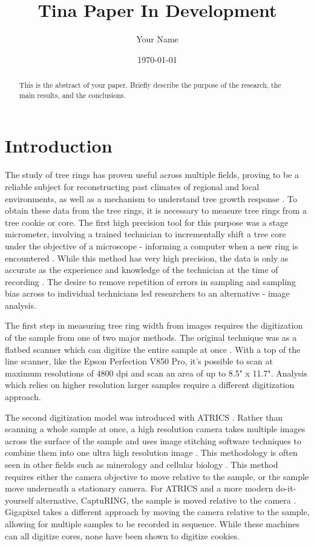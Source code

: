 \documentclass[a4paper,12pt]{article}
\title{Tina Paper In Development}
\author{Your Name}
\date{\today}
\begin{document}
\maketitle

\begin{abstract}
    This is the abstract of your paper. Briefly describe the purpose of the research, the main results, and the conclusions.
\end{abstract}

\section{Introduction}
The study of tree rings has proven useful across multiple fields, proving to be a reliable subject for reconstructing past climates of regional and local environments, as well as a mechanism to understand tree growth response \citep{fritts_dendroclimatology_1971} \citep{williams_using_2010} \citep{guibal_dendrochronology_2021} \citep{sheppard_dendroclimatology_2010}.
To obtain these data from the tree rings, it is necessary to measure tree rings from a tree cookie or core. The first high precision tool for this purpose was a stage micrometer, involving a trained technician to incrementally shift a tree core under the objective of a microscope - informing a computer when a new ring is encountered \citep{robinson_microcomputer_nodate}.
While this method has very high precision, the data is only as accurate as the experience and knowledge of the technician at the time of recording \citep{levanic_atrics_2007}.
The desire to remove repetition of errors in sampling and sampling bias across to individual technicians led researchers to an alternative - image analysis. 

The first step in measuring tree ring width from images requires the digitization of the sample from one of two major methods.  
The original technique was as a flatbed scanner which can digitize the entire sample at once \citep{guay_new_1992}. 
With a top of the line scanner, like the Epson Perfection V850 Pro, it's possible to scan at maximum resolutions of 4800 dpi and scan an area of up to 8.5" x 11.7".
Analysis which relies on higher resolution larger samples require a different digitization approach. 

The second digitization model was introduced with ATRICS \citep{levanic_atrics_2007}. 
Rather than scanning a whole sample at once, a high resolution camera takes multiple images across the surface of the sample and uses image stitching software techniques to combine them into one ultra high resolution image \citep{muhlich_stitching_2022}.
This methodology is often seen in other fields such as mineralogy and cellular biology \citep{ro_image_2021,mohammadi_fast_2024}. 
This method requires either the camera objective to move relative to the sample, or the sample move underneath a stationary camera. 
For ATRICS and a more modern do-it-yourself alternative, CaptuRING, the sample is moved relative to the camera \citep{garcia-hidalgo_capturing_2022}. 
Gigapixel takes a different approach by moving the camera relative to the sample, allowing for multiple samples to be recorded in sequence. 
While these machines can all digitize cores, none have been shown to digitize cookies.
\end{document}
